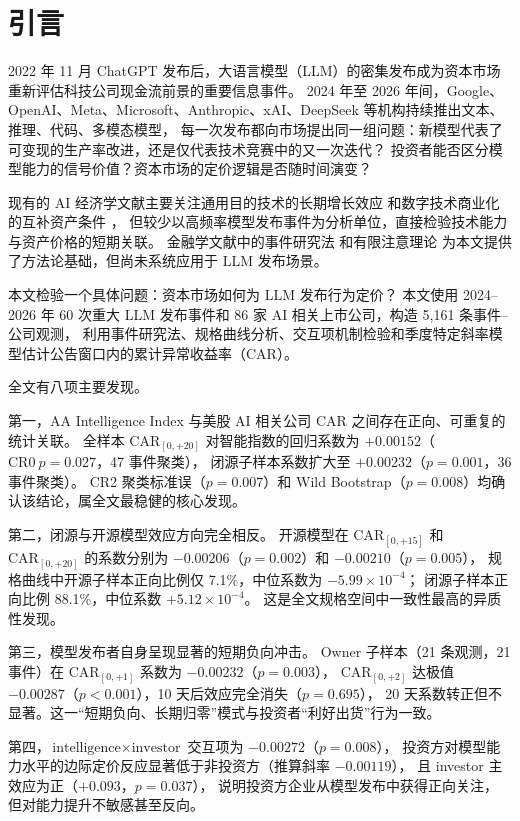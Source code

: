 \documentclass[11pt,fontset=fandol,a4paper]{ctexart}
\begin{document}
\newpage
\section{引言}

2022 年 11 月 ChatGPT 发布后，大语言模型（LLM）的密集发布成为资本市场重新评估科技公司现金流前景的重要信息事件。
2024 年至 2026 年间，Google、OpenAI、Meta、Microsoft、Anthropic、xAI、DeepSeek 等机构持续推出文本、推理、代码、多模态模型，
每一次发布都向市场提出同一组问题：新模型代表了可变现的生产率改进，还是仅代表技术竞赛中的又一次迭代？
投资者能否区分模型能力的信号价值？资本市场的定价逻辑是否随时间演变？

现有的 AI 经济学文献主要关注通用目的技术的长期增长效应 \citep{Bresnahan2010} 和数字技术商业化的互补资产条件 \citep{GoldfarbTucker2019}，
但较少以高频率模型发布事件为分析单位，直接检验技术能力与资产价格的短期关联。
金融学文献中的事件研究法 \citep{MacKinlay1997} 和有限注意理论 \citep{HirshleiferTeoh2003,DaEngelbergGao2011}
为本文提供了方法论基础，但尚未系统应用于 LLM 发布场景。

本文检验一个具体问题：资本市场如何为 LLM 发布行为定价？
本文使用 2024--2026 年 60 次重大 LLM 发布事件和 86 家 AI 相关上市公司，构造 5{,}161 条事件--公司观测，
利用事件研究法、规格曲线分析、交互项机制检验和季度特定斜率模型估计公告窗口内的累计异常收益率（CAR）。

全文有八项主要发现。

第一，AA Intelligence Index 与美股 AI 相关公司 CAR 之间存在正向、可重复的统计关联。
全样本 $\text{CAR}_{[0,+20]}$ 对智能指数的回归系数为 $+0.00152$（$\text{CR0}\ p=0.027$，47 事件聚类），
闭源子样本系数扩大至 $+0.00232$（$p=0.001$，36 事件聚类）。
CR2 聚类标准误（$p=0.007$）和 Wild Bootstrap（$p=0.008$）均确认该结论，属全文最稳健的核心发现。

第二，闭源与开源模型效应方向完全相反。
开源模型在 $\text{CAR}_{[0,+15]}$ 和 $\text{CAR}_{[0,+20]}$ 的系数分别为 $-0.00206$（$p=0.002$）和 $-0.00210$（$p=0.005$），
规格曲线中开源子样本正向比例仅 7.1\%，中位系数为 $-5.99\times10^{-4}$；
闭源子样本正向比例 88.1\%，中位系数 $+5.12\times10^{-4}$。
这是全文规格空间中一致性最高的异质性发现。

第三，模型发布者自身呈现显著的短期负向冲击。
Owner 子样本（21 条观测，21 事件）在 $\text{CAR}_{[0,+1]}$ 系数为 $-0.00232$（$p=0.003$），
$\text{CAR}_{[0,+2]}$ 达极值 $-0.00287$（$p<0.001$），10 天后效应完全消失（$p=0.695$），
20 天系数转正但不显著。这一``短期负向、长期归零''模式与投资者``利好出货''行为一致。

第四，$\text{intelligence}\times\text{investor}$ 交互项为 $-0.00272$（$p=0.008$），
投资方对模型能力水平的边际定价反应显著低于非投资方（推算斜率 $-0.00119$），
且 investor 主效应为正（$+0.093$，$p=0.037$），
说明投资方企业从模型发布中获得正向关注，但对能力提升不敏感甚至反向。
\end{document}
